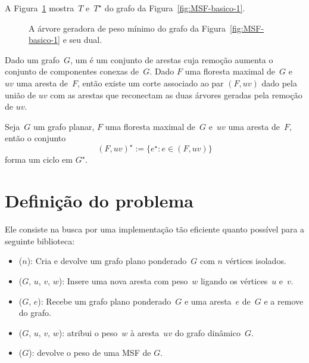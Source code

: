 A Figura~\ref{fig:MSF-figura-2} mostra~$T$ e~$T^\star$ do grafo da Figura~\ref{fig:MSF-basico-1}.


\begin{figure}[htb]
\scalebox{1.5}{
\centering

}
\caption{A árvore geradora de peso mínimo do grafo da Figura~\ref{fig:MSF-basico-1} e seu dual.}
\label{fig:MSF-figura-2}
\end{figure}



Dado um grafo~$G$, um  é um conjunto de arestas cuja remoção aumenta o conjunto de componentes conexas de~$G$.
Dado $F$ uma floresta maximal de~$G$ e~$uv$ uma aresta de~$F$, então existe um corte associado ao par $(F, uv)$ dado pela união de $uv$ com as arestas que reconectam as duas árvores geradas pela remoção de $uv$.


\begin{theorem}
\label{teo:cutset}
Seja~$G$ um grafo planar, $F$ uma floresta maximal de~$G$ e~$uv$ uma aresta de~$F$, então o conjunto
$$
(F, uv)^\star := \{e^\star:e\in (F, uv)\}
$$
forma um ciclo em $G^\star$.
\end{theorem}


\section{Definição do problema}
\label{sec:definition-MSF}

Ele consiste na busca por uma implementação tão eficiente quanto possível para a seguinte biblioteca:

\begin{itemize}
\item \MSFCreate($n$): Cria e devolve um grafo plano ponderado~$G$ com $n$ vértices isolados.
\item \MSFaddEdge($G$, $u$, $v$, $w$): Insere uma nova aresta com peso~$w$ ligando os vértices~$u$ e~$v$.
\item \MSFdelEdge($G$, $e$): Recebe um grafo plano ponderado~$G$ e uma aresta~$e$ de~$G$ e a remove do grafo.
\item \MSFupdate($G$, $u$, $v$, $w$): atribui o peso~$w$ à aresta~$uv$ do grafo dinâmico~$G$.
\item \MSFweight($G$): devolve o peso de uma MSF de $G$.
\end{itemize}


